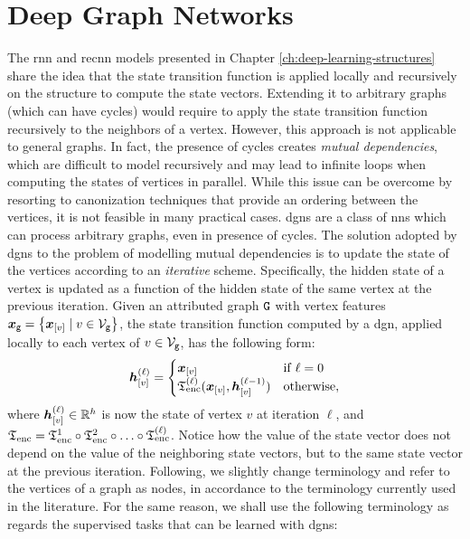 \chapter{Deep Graph Networks} \label{ch:dgn}

The \gls{rnn} and \gls{recnn} models presented in Chapter \ref{ch:deep-learning-structures} share the idea that the state transition function is applied locally and recursively on the structure to compute the state vectors. Extending it to arbitrary graphs (which can have cycles) would require to apply the state transition function recursively to the neighbors of a vertex. However, this approach is not applicable to general graphs. In fact, the presence of cycles creates \emph{mutual dependencies}, which are difficult to model recursively and may lead to infinite loops when computing the states of vertices in parallel. While this issue can be overcome by resorting to canonization techniques that provide an ordering between the vertices, it is not feasible in many practical cases. \glspl{dgn} are a class of \glspl{nn} which can process arbitrary graphs, even in presence of cycles. The solution adopted by \glspl{dgn} to the problem of modelling mutual dependencies is to update the state of the vertices according to an \emph{iterative} scheme. Specifically, the hidden state of a vertex is updated as a function of the hidden state of the same vertex at the previous iteration. Given an attributed graph $\GraphU{g}$ with vertex features $\GraphFeatures{x}{g} = \Set{\Elem{x}{v} \mid v \in \Nodes{g}}$, the state transition function computed by a \gls{dgn}, applied locally to each vertex of $v \in \Nodes{g}$, has the following form:
\begin{align*}
    \StateVector{v}{\ell}=
    \begin{cases}
        \Elem{x}{v} & \mathrm{if}\; \ell = 0\\
        \EncTrans^{(\ell)}(\Elem{x}{v}, \StateVector{v}{\ell-1}) & \mathrm{otherwise},
    \end{cases}
\end{align*}
where $\StateVector{v}{\ell} \in \Real^h$ is now the state of vertex $v$ at iteration $\ell$, and $\mathfrak{T}_{\mathrm{enc}} = \mathfrak{T}_{\mathrm{enc}}^{1} \circ \mathfrak{T}_{\mathrm{enc}}^{2} \circ \ldots \circ \mathfrak{T}_{\mathrm{enc}}^{(\ell)}$. Notice how the value of the state vector does not depend on the value of the neighboring state vectors, but to the same state vector at the previous iteration. Following, we slightly change terminology and refer to the vertices of a graph as nodes, in accordance to the terminology currently used in the literature. For the same reason, we shall use the following terminology as regards the supervised tasks that can be learned with \glspl{dgn}:
